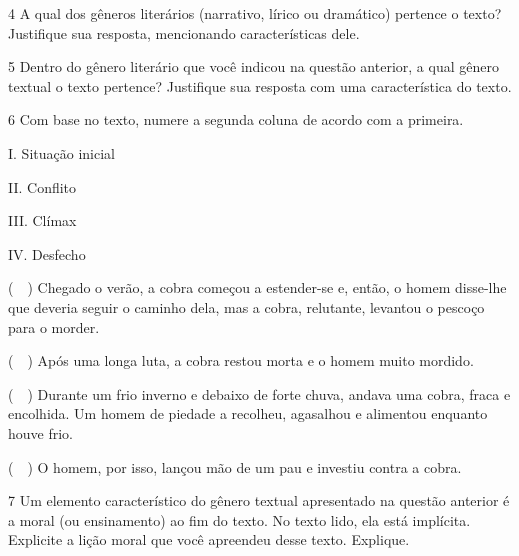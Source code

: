 \num{4} A qual dos gêneros literários (narrativo, lírico ou dramático)
pertence o texto? Justifique sua resposta, mencionando características dele.


\num{5} Dentro do gênero literário que você indicou na questão anterior,
a qual gênero textual o texto pertence? Justifique sua resposta com uma característica do texto.


\pagebreak

\num{6} Com base no texto, numere a segunda coluna de acordo com a
primeira.

\begin{multicols}{2}

I. Situação inicial

II. Conflito

III. Clímax

IV. Desfecho
\columnbreak

(~~) Chegado o verão, a cobra começou a
estender-se e, então, o homem disse-lhe que deveria seguir o caminho
dela, mas a cobra, relutante, levantou o pescoço para o morder.

(~~) Após uma longa luta, a cobra restou morta e o homem muito mordido.

(~~) Durante um frio
inverno e debaixo de forte chuva, andava uma cobra, fraca e encolhida.
Um homem de piedade a recolheu, agasalhou e alimentou enquanto houve frio. 

(~~) O homem, por isso, lançou mão de um
pau e investiu contra a cobra.
\end{multicols}

\num{7} Um elemento característico do gênero textual apresentado na
questão anterior é a moral (ou ensinamento) ao fim do texto. No texto
lido, ela está implícita. Explicite a lição moral que você apreendeu desse texto. Explique.


